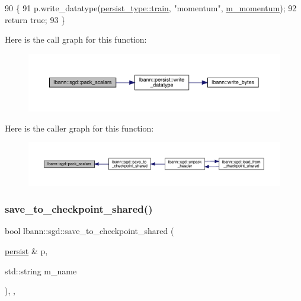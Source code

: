 \begin{DoxyCode}
90                                 \{
91     p.write\_datatype(\hyperlink{namespacelbann_adee41f31f15f3906cbdcce4a1417eb56a61b3a8faa9c1091806675c230a9abe64}{persist\_type::train}, \textcolor{stringliteral}{"momentum"}, 
      \hyperlink{classlbann_1_1sgd_a2e56d66d350debcf0d2c3ad76c214074}{m\_momentum});
92     \textcolor{keywordflow}{return} \textcolor{keyword}{true};
93   \}
\end{DoxyCode}
Here is the call graph for this function\+:\nopagebreak
\begin{figure}[H]
\begin{center}
\leavevmode
\includegraphics[width=350pt]{classlbann_1_1sgd_ab95756a63ec3fa0100d436a5a9addfeb_cgraph}
\end{center}
\end{figure}
Here is the caller graph for this function\+:\nopagebreak
\begin{figure}[H]
\begin{center}
\leavevmode
\includegraphics[width=350pt]{classlbann_1_1sgd_ab95756a63ec3fa0100d436a5a9addfeb_icgraph}
\end{center}
\end{figure}
\mbox{\label{classlbann_1_1sgd_a78ad11ca7424d50a9f2ba29e5f725e21}} 
\subsubsection{\texorpdfstring{save\+\_\+to\+\_\+checkpoint\+\_\+shared()}{save\_to\_checkpoint\_shared()}}
{\footnotesize\ttfamily bool lbann\+::sgd\+::save\+\_\+to\+\_\+checkpoint\+\_\+shared (\begin{DoxyParamCaption}\item[{\hyperlink{classlbann_1_1persist}{persist} \&}]{p,  }\item[{std\+::string}]{m\+\_\+name }\end{DoxyParamCaption})\hspace{0.3cm}{\ttfamily [override]}, {\ttfamily [private]}, {\ttfamily [virtual]}}




